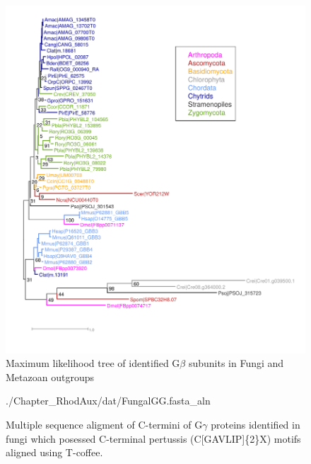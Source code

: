 \begin{figure}[htbp]
  \includegraphics{./Chapter_RhodAux/img/Gbeta_tree.png}
  \caption[G$\beta$ tree]{Maximum likelihood tree of identified G$\beta$ subunits in Fungi and Metazoan outgroups}
  \label{fig:ChRhodA_GbetaTree}
\end{figure}

\begin{figure}[htbp]
  \begin{texshade}{./Chapter_RhodAux/dat/FungalGG.fasta_aln}
    \hidenumbering
  \end{texshade}
  \caption[G$\gamma$ MSA]{Multiple sequence aligment of C-termini of G$\gamma$ proteins identified in fungi which posessed C-terminal pertussis (C[GAVLIP]\{2\}X) motifs aligned using T-coffee.}
  \label{fig:ChRhodA_ggMSA}
\end{figure}


